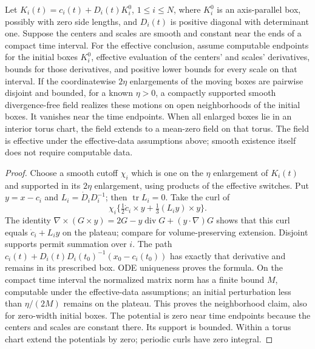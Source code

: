 \begin{lemma}
\label{lem:bb-curl}
Let $K_i(t)=c_i(t)+D_i(t)K_i^0$, $1\le i\le N$, where $K_i^0$ is
an axis-parallel box, possibly with zero side lengths, and $D_i(t)$ is
positive diagonal with determinant one.  Suppose the centers and scales
are smooth and constant near the ends of a compact time interval.
For the effective conclusion, assume computable endpoints for the
initial boxes $K_i^0$, effective evaluation of the centers' and scales'
derivatives, bounds for those derivatives, and positive lower bounds
for every scale on that interval.
If the coordinatewise $2\eta$ enlargements of the moving boxes are
pairwise disjoint and bounded, for a known $\eta>0$, a
compactly supported smooth divergence-free field realizes these motions
on open neighborhoods of the initial boxes.  It vanishes near the time
endpoints.  When all enlarged boxes lie in an interior torus chart,
the field extends to a mean-zero field on that torus.
The field is effective under the effective-data assumptions above;
smooth existence itself does not require computable data.
\end{lemma}
\begin{proof}
Choose a smooth cutoff $\chi_i$ which is one on the $\eta$
enlargement of $K_i(t)$ and supported in its $2\eta$ enlargement,
using products of the effective switches.  Put $y=x-c_i$ and
$L_i=\dot D_iD_i^{-1}$; then $\operatorname{tr}L_i=0$.
Take the curl of
\begin{equation}\label{eq:bb-potential}
 \chi_i\{\tfrac12\dot c_i\times y+\tfrac13(L_i y)\times y\}.
\end{equation}
The identity
$\nabla\times(G\times y)=2G-y\operatorname{div}G+(y\cdot\nabla)G$
shows that this curl equals $\dot c_i+L_i y$ on the plateau; compare \cite{Krygin1971} for volume-preserving extension.
Disjoint supports permit summation over $i$.  The path
$c_i(t)+D_i(t)D_i(t_0)^{-1}(x_0-c_i(t_0))$ has exactly that
derivative and remains in its prescribed box.  ODE uniqueness proves
the formula.  On the compact time interval the normalized matrix norm
has a finite bound $M$, computable under the effective-data assumptions;
an initial perturbation less than
$\eta/(2M)$ remains on the plateau.  This proves the neighborhood
claim, also for zero-width initial boxes.
The potential is zero near time endpoints because the centers and
scales are constant there.  Its support is bounded.  Within a torus
chart extend the potentials by zero; periodic curls have zero integral.
\end{proof}

